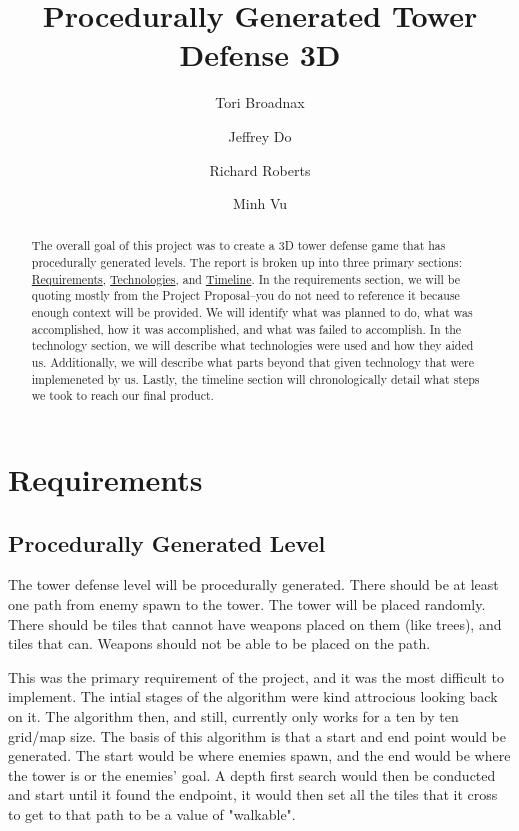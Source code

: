 \documentclass{article}
\title{Procedurally Generated Tower Defense 3D}
\author[1]{Tori Broadnax}
\author[1]{Jeffrey Do}
\author[1]{Richard Roberts}
\author[1]{Minh Vu}
\affil[1]{George Mason University}
\begin{document}
\maketitle

\begin{abstract}
    The overall goal of this project was to create a 3D tower defense game that has procedurally generated levels. The report is broken up into three primary sections: \hyperref[sec:Requirements]{Requirements}, \hyperref[sec:Technologies]{Technologies}, and \hyperref[sec:Timeline]{Timeline}. In the requirements section, we will be quoting mostly from the Project Proposal--you do not need to reference it because enough context will be provided. We will identify what was planned to do, what was accomplished, how it was accomplished, and what was failed to accomplish. In the technology section, we will describe what technologies were used and how they aided us. Additionally, we will describe what parts beyond that given technology that were implemeneted by us. Lastly, the timeline section will chronologically detail what steps we took to reach our final product.
\end{abstract}

\newpage

\tableofcontents

\newpage

\section{Requirements}
\label{sec:Requirements}

\subsection{Procedurally Generated Level}

\begin{displayquote}
    \small
    The tower defense level will be procedurally generated. There should be at least one path from enemy spawn to the tower. The tower will be placed randomly. There should be tiles that cannot have weapons placed on them (like trees), and tiles that can. Weapons should not be able to be placed on the path.
\end{displayquote}

This was the primary requirement of the project, and it was the most difficult to implement. The intial stages of the algorithm were kind attrocious looking back on it. The algorithm then, and still, currently only works for a ten by ten grid/map size. The basis of this algorithm is that a start and end point would be generated. The start would be where enemies spawn, and the end would be where the tower is or the enemies' goal. A depth first search would then be conducted and start until it found the endpoint, it would then set all the tiles that it cross to get to that path to be a value of "walkable".
\end{document}
